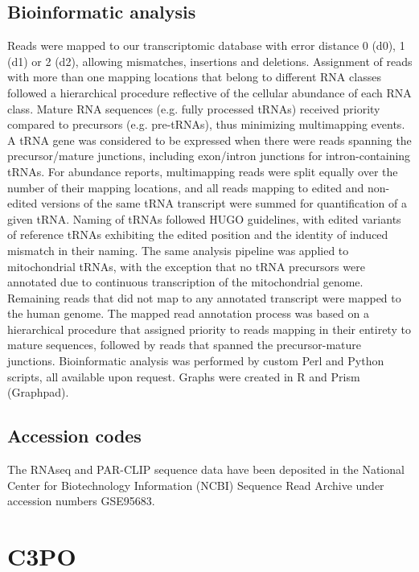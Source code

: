 \documentclass[12pt]{rockefeller}
\begin{document}
\section{Bioinformatic analysis}
Reads were mapped to our transcriptomic database with error distance 0 (d0), 1 (d1) or 2 (d2), allowing mismatches, insertions and deletions. Assignment of reads with more than one mapping locations that belong to different RNA classes followed a hierarchical procedure reflective of the cellular abundance of each RNA class. Mature RNA sequences (e.g. fully processed tRNAs) received priority compared to precursors (e.g. pre-tRNAs), thus minimizing multimapping events. A tRNA gene was considered to be expressed when there were reads spanning the precursor/mature junctions, including exon/intron junctions for intron-containing tRNAs. For abundance reports, multimapping reads were split equally over the number of their mapping locations, and all reads mapping to edited and non-edited versions of the same tRNA transcript were summed for quantification of a given tRNA. Naming of tRNAs followed HUGO guidelines, with edited variants of reference tRNAs exhibiting the edited position and the identity of induced mismatch in their naming. The same analysis pipeline was applied to mitochondrial tRNAs, with the exception that no tRNA precursors were annotated due to continuous transcription of the mitochondrial genome. Remaining reads that did not map to any annotated transcript were mapped to the human genome. The mapped read annotation process was based on a hierarchical procedure that assigned priority to reads mapping in their entirety to mature sequences, followed by reads that spanned the precursor-mature junctions. Bioinformatic analysis was performed by custom Perl and Python scripts, all available upon request. Graphs were created in R and Prism (Graphpad).

\section{Accession codes}
The RNAseq and PAR-CLIP sequence data have been deposited in the National Center for Biotechnology Information (NCBI) Sequence Read Archive under accession numbers GSE95683.

\chapter{C3PO}
\end{document}
